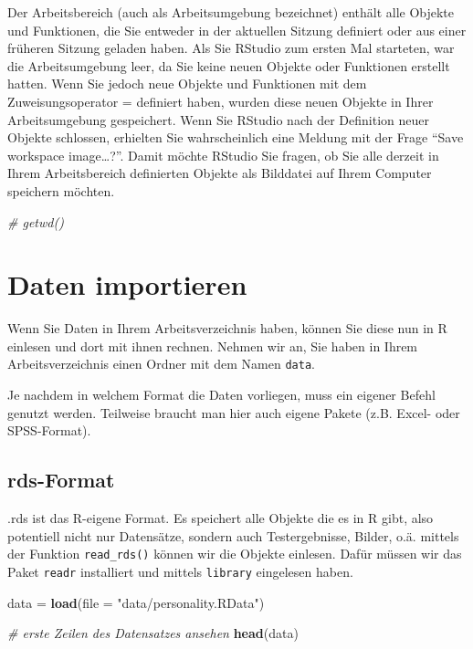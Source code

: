 \documentclass[
]{book}
\newenvironment{Shaded}{\begin{snugshade}}{\end{snugshade}}
\newcommand{\AttributeTok}[1]{\textcolor[rgb]{0.13,0.29,0.53}{#1}}
\newcommand{\CommentTok}[1]{\textcolor[rgb]{0.56,0.35,0.01}{\textit{#1}}}
\newcommand{\FunctionTok}[1]{\textcolor[rgb]{0.13,0.29,0.53}{\textbf{#1}}}
\newcommand{\NormalTok}[1]{#1}
\newcommand{\OtherTok}[1]{\textcolor[rgb]{0.56,0.35,0.01}{#1}}
\newcommand{\StringTok}[1]{\textcolor[rgb]{0.31,0.60,0.02}{#1}}
\begin{document}
Der Arbeitsbereich (auch als Arbeitsumgebung bezeichnet) enthält alle Objekte und Funktionen, die Sie entweder in der aktuellen Sitzung definiert oder aus einer früheren Sitzung geladen haben. Als Sie RStudio zum ersten Mal starteten, war die Arbeitsumgebung leer, da Sie keine neuen Objekte oder Funktionen erstellt hatten. Wenn Sie jedoch neue Objekte und Funktionen mit dem Zuweisungsoperator = definiert haben, wurden diese neuen Objekte in Ihrer Arbeitsumgebung gespeichert. Wenn Sie RStudio nach der Definition neuer Objekte schlossen, erhielten Sie wahrscheinlich eine Meldung mit der Frage ``Save workspace image\ldots?''. Damit möchte RStudio Sie fragen, ob Sie alle derzeit in Ihrem Arbeitsbereich definierten Objekte als Bilddatei auf Ihrem Computer speichern möchten.

\begin{Shaded}
\begin{Highlighting}[]
\CommentTok{\# getwd()}
\end{Highlighting}
\end{Shaded}

\section{Daten importieren}\label{daten-importieren}

Wenn Sie Daten in Ihrem Arbeitsverzeichnis haben, können Sie diese nun in R einlesen und dort mit ihnen rechnen. Nehmen wir an, Sie haben in Ihrem Arbeitsverzeichnis einen Ordner mit dem Namen \texttt{data}.

Je nachdem in welchem Format die Daten vorliegen, muss ein eigener Befehl genutzt werden. Teilweise braucht man hier auch eigene Pakete (z.B. Excel- oder SPSS-Format).

\subsection{rds-Format}\label{rds-format}

.rds ist das R-eigene Format. Es speichert alle Objekte die es in R gibt, also potentiell nicht nur Datensätze, sondern auch Testergebnisse, Bilder, o.ä. mittels der Funktion \texttt{read\_rds()} können wir die Objekte einlesen. Dafür müssen wir das Paket \texttt{readr} installiert und mittels \texttt{library} eingelesen haben.

\begin{Shaded}
\begin{Highlighting}[]
\NormalTok{data }\OtherTok{=} \FunctionTok{load}\NormalTok{(}\AttributeTok{file =} \StringTok{"data/personality.RData"}\NormalTok{)}

\CommentTok{\# erste Zeilen des Datensatzes ansehen}
\FunctionTok{head}\NormalTok{(data)}
\end{Highlighting}
\end{Shaded}
\end{document}
